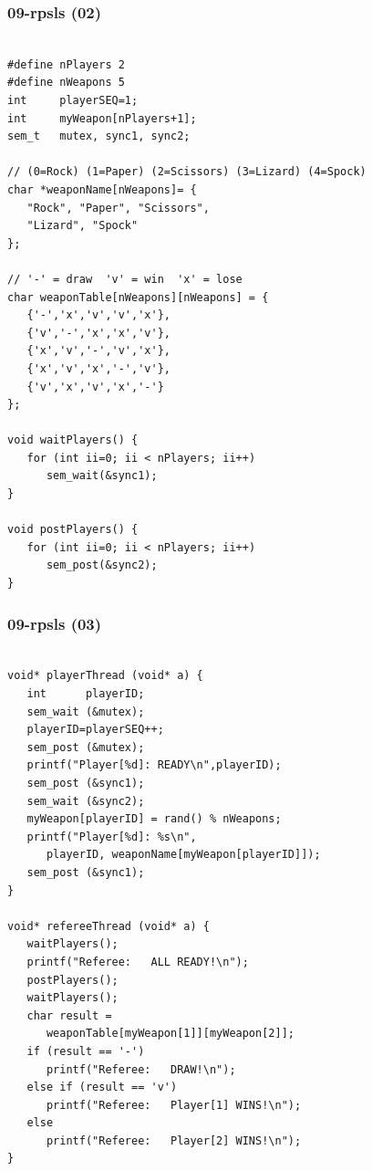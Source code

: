 \documentclass[xcolor=table, notheorems, hyperref={pdfpagelabels=false}]{beamer}
\begin{document}
\begin{frame}[fragile]
\frametitle{09-rpsls (02)}
\begin{lstlisting}[basicstyle=\ttfamily\tiny]

#define nPlayers 2
#define nWeapons 5
int     playerSEQ=1;
int     myWeapon[nPlayers+1];
sem_t   mutex, sync1, sync2;

// (0=Rock) (1=Paper) (2=Scissors) (3=Lizard) (4=Spock)
char *weaponName[nWeapons]= {
   "Rock", "Paper", "Scissors", 
   "Lizard", "Spock"
};

// '-' = draw  'v' = win  'x' = lose
char weaponTable[nWeapons][nWeapons] = {
   {'-','x','v','v','x'},
   {'v','-','x','x','v'},
   {'x','v','-','v','x'},
   {'x','v','x','-','v'},
   {'v','x','v','x','-'}
};

void waitPlayers() {
   for (int ii=0; ii < nPlayers; ii++)
      sem_wait(&sync1);
}

void postPlayers() {
   for (int ii=0; ii < nPlayers; ii++)
      sem_post(&sync2);
}

\end{lstlisting}
\end{frame}

\begin{frame}[fragile]
\frametitle{09-rpsls (03)}
\begin{lstlisting}[basicstyle=\ttfamily\tiny]

void* playerThread (void* a) {
   int      playerID;
   sem_wait (&mutex);
   playerID=playerSEQ++;
   sem_post (&mutex);
   printf("Player[%d]: READY\n",playerID);
   sem_post (&sync1);
   sem_wait (&sync2);
   myWeapon[playerID] = rand() % nWeapons;
   printf("Player[%d]: %s\n", 
      playerID, weaponName[myWeapon[playerID]]);
   sem_post (&sync1);
}

void* refereeThread (void* a) {
   waitPlayers();
   printf("Referee:   ALL READY!\n");
   postPlayers();
   waitPlayers();
   char result = 
      weaponTable[myWeapon[1]][myWeapon[2]];
   if (result == '-') 
      printf("Referee:   DRAW!\n");
   else if (result == 'v')
      printf("Referee:   Player[1] WINS!\n");
   else
      printf("Referee:   Player[2] WINS!\n");
}

\end{lstlisting}
\end{frame}
\end{document}
